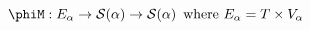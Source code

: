 \documentclass[preview]{standalone}
\begin{document}
\begin{equation*}
  \phiM : E_\alpha \rightarrow \mathcal{S}(\alpha) \rightarrow \mathcal{S}(\alpha) \,
  \text{ where } E_\alpha = T \times V_\alpha
\end{equation*}
\end{document}
